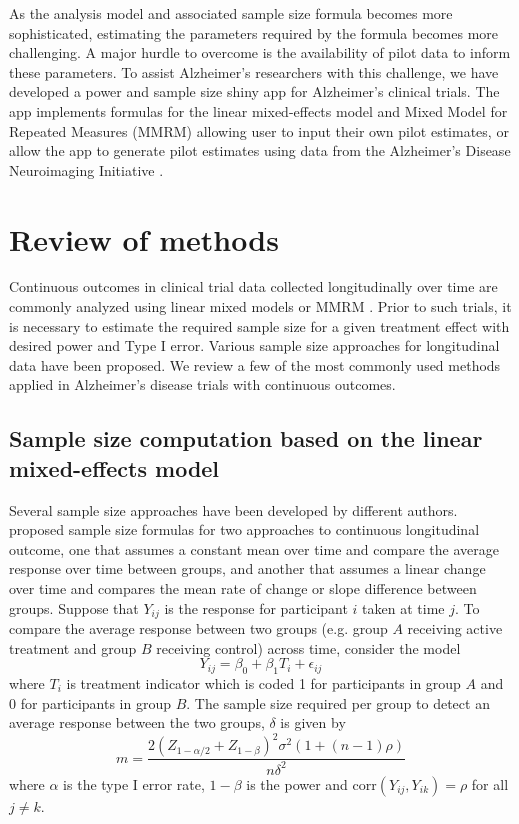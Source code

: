 As the analysis model and associated sample size formula becomes more sophisticated, estimating the parameters required by the formula becomes more challenging. A major hurdle to overcome is the availability of pilot data to inform these parameters. To assist Alzheimer's researchers with this challenge, we have developed a power and sample size shiny app for Alzheimer's clinical trials. The app implements formulas for the linear mixed-effects model and Mixed Model for Repeated Measures (MMRM) \citep{Lu_Luo_Chen(2008)} allowing user to input their own pilot estimates, or allow the app to generate pilot estimates using data from the Alzheimer's Disease Neuroimaging Initiative \citep[ADNI; ][]{Weiner_etal(2015)}.

\section{Review of methods}
\label{sec2}
Continuous outcomes in clinical trial data collected longitudinally over time are commonly analyzed using linear mixed models \citep{Laird_Ware(1982)} or MMRM \citep{Mallinckrodt_etal(2001),Mallinckrodt_etal(2003)}. Prior to such trials, it is necessary to estimate the required sample size for a given treatment effect with desired power and Type I error. Various sample size approaches for longitudinal data have been proposed. We review a few of the most commonly used methods applied in Alzheimer’s disease trials with continuous outcomes.


\subsection{Sample size computation based on the linear mixed-effects model}
\label{model}
Several sample size approaches have been developed by different authors. \cite{Diggle_etal(2002)} proposed sample size formulas for two approaches to continuous longitudinal outcome, one that assumes a constant mean over time and compare the average response over time between groups, and another that assumes a linear change over time and compares the mean rate of change or slope difference between groups. Suppose that $Y_{ij}$ is the response for participant $i$ taken at time $j$. To compare the average response between two groups (e.g. group $A$ receiving active treatment and group $B$ receiving control) across time, consider the model
$$Y_{ij}=\beta_0+\beta_1T_i+\epsilon_{ij}$$
where $T_i$ is treatment indicator which is coded 1 for participants in group $A$ and 0 for participants in group $B$. The sample size required per group to detect an average response between the two groups, $\delta$ is given by
$$m=\frac{2(Z_{1-\alpha/2}+Z_{1-\beta})^2\sigma^2(1+(n-1)\rho)}{n\delta^2}$$
where $\alpha$ is the type I error rate, $1-\beta$ is the power and $\mbox{corr}(Y_{ij},Y_{ik})=\rho$ for all $j\neq k$.

